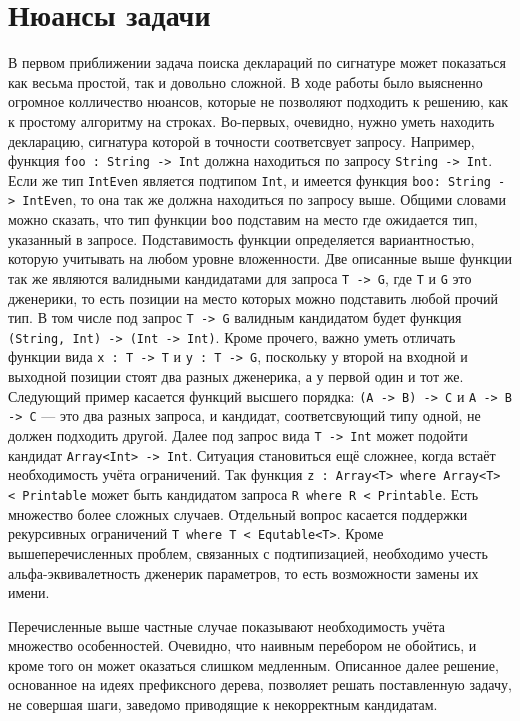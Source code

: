 \documentclass[times]{itmo-student-thesis}
\begin{document}
	\section{Нюансы задачи}
	В первом приближении задача поиска деклараций по сигнатуре может показаться как весьма простой, так и довольно сложной. В ходе работы было выясненно огромное колличество нюансов, которые не позволяют подходить к решению, как к простому алгоритму на строках. Во-первых, очевидно, нужно уметь находить декларацию, сигнатура которой в точности соответсвует запросу. Например, функция \lstinline{foo : String -> Int} должна находиться по запросу \lstinline{String -> Int}. Если же тип  \lstinline{IntEven} является подтипом \lstinline{Int}, и имеется функция \lstinline{boo: String -> IntEven}, то она так же должна находиться по запросу выше. Общими словами можно сказать, что тип функции \lstinline{boo} подставим на место где ожидается тип, указанный в запросе. Подставимость функции определяется вариантностью, которую учитывать на любом уровне вложенности. Две описанные выше функции так же являются валидными кандидатами для запроса \lstinline{T -> G}, где \lstinline{T} и \lstinline{G} это дженерики, то есть позиции на место которых можно подставить любой прочий тип. В том числе под запрос \lstinline{T -> G} валидным кандидатом будет функция  \lstinline{(String, Int) -> (Int -> Int)}. Кроме прочего, важно уметь отличать функции вида \lstinline{x : T -> T} и \lstinline{y : T -> G}, поскольку у второй на входной и выходной позиции стоят два разных дженерика, а у первой один и тот же. Следующий пример касается функций высшего порядка: \lstinline{(A -> B) -> C} и \lstinline{A -> B -> C} --- это два разных запроса, и кандидат, соответсвующий типу одной, не должен подходить другой. Далее под запрос вида \lstinline{T -> Int} может подойти кандидат \lstinline{Array<Int> -> Int}. Ситуация становиться ещё сложнее, когда встаёт необходимость учёта ограничений. Так функция \lstinline{z : Array<T> where Array<T> < Printable} может быть кандидатом запроса \lstinline{R where R < Printable}. Есть множество более сложных случаев. Отдельный вопрос касается поддержки рекурсивных ограничений \lstinline{T where T < Equtable<T>}. Кроме вышеперечисленных проблем, связанных с подтипизацией, необходимо учесть альфа-эквивалетность дженерик параметров, то есть возможности замены их имени.
	
	Перечисленные выше частные случае показывают необходимость учёта множество особенностей. Очевидно, что наивным перебором не обойтись, и кроме того он может оказаться слишком медленным. Описанное далее решение, основанное на идеях префиксного дерева, позволяет решать поставленную задачу, не совершая шаги, заведомо приводящие к некорректным кандидатам.
	
\end{document}
